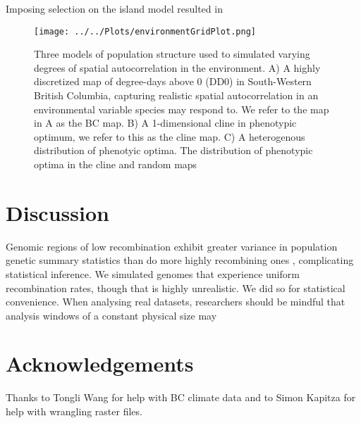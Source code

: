 \documentclass[11pt,twoside,lineno]{GSA_format}
\begin{document}
Imposing selection on the island model resulted in 

\begin{figure}
  \texttt{[image: ../../Plots/environmentGridPlot.png]}
  \caption{Three models of population structure used to simulated varying degrees of spatial autocorrelation in the environment. A) A highly discretized map of degree-days above 0 (DD0) in South-Western British Columbia, capturing realistic spatial autocorrelation in an environmental variable species may respond to. We refer to the map in A as the BC map. B) A 1-dimensional cline in phenotypic optimum, we refer to this as the cline map. C) A heterogenous distribution of phenotyic optima. The distribution of phenotypic optima in the cline and random maps}
  
  \label{fig:boat1}
\end{figure}

\section{Discussion}

Genomic regions of low recombination exhibit greater variance in population genetic summary statistics than do more highly recombining ones , complicating statistical inference. We simulated genomes that experience uniform recombination rates, though that is highly unrealistic. We did so for statistical convenience. When analysing real datasets, researchers should be mindful that analysis windows of a constant physical size may 


\section{Acknowledgements}

Thanks to Tongli Wang for help with BC climate data and to Simon Kapitza for help with wrangling raster files. 



%
\end{document}
